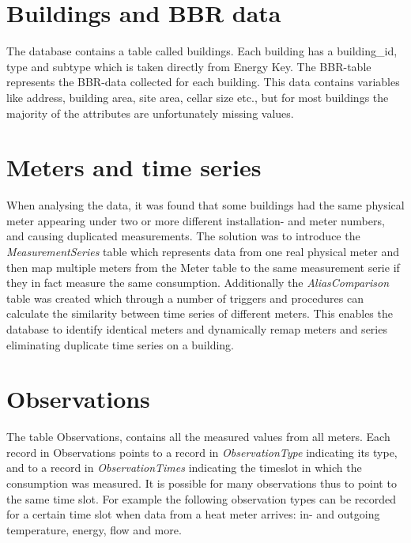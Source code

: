 \section*{Buildings and BBR data}
The database contains a table called buildings. Each building has a building\_id, type and subtype which is taken directly from Energy Key. The BBR-table represents the BBR-data collected for each building. This data contains variables like address, building area, site area, cellar size etc., but for most buildings the majority of the attributes are unfortunately missing values.
\section*{Meters and time series}
When analysing the data, it was found that some buildings had the same physical meter appearing under two or more different installation- and meter numbers, and causing duplicated measurements. The solution was to introduce the \emph{MeasurementSeries} table which represents data from one real physical meter and then map multiple meters from the Meter table to the same measurement serie if they in fact measure the same consumption. Additionally the \emph{AliasComparison} table was created which through a number of triggers and procedures can calculate the similarity between time series of different meters. This enables the database to identify identical meters and dynamically remap meters and series eliminating duplicate time series on a building.
\section*{Observations}
The table Observations, contains all the measured values from all meters. Each record in Observations points to a record in \emph{ObservationType} indicating its type, and to a record in \emph{ObservationTimes} indicating the timeslot in which the consumption was measured. It is possible for many observations thus to point to the same time slot. For example the following observation types can be recorded for a certain time slot when data from a heat meter arrives: in- and outgoing temperature, energy, flow and more.
